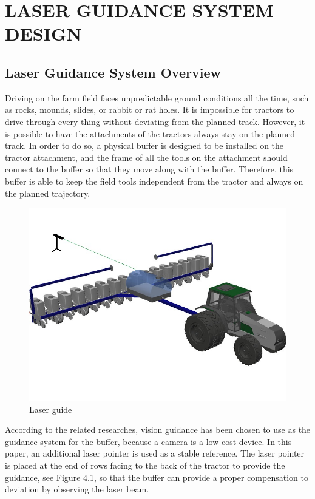 \chapter{LASER GUIDANCE SYSTEM DESIGN}

\section{Laser Guidance System Overview}
Driving on the farm field faces unpredictable ground conditions all the time, such as rocks, mounds, slides, or rabbit or rat holes. It is impossible for tractors to drive through every thing without deviating from the planned track. However, it is possible to have the attachments of the tractors always stay on the planned track. In order to do so, a physical buffer is designed to be installed on the tractor attachment, and the frame of all the tools on the attachment should connect to the buffer so that they move along with the buffer. Therefore, this buffer is able to keep the field tools independent from the tractor and always on the planned trajectory.
\begin{figure}[ht!]
\begin{center}
\includegraphics[scale = 0.6]{pics/tractor.jpg}
\caption{Laser guide}
\end{center}
\end{figure}

According to the related researches, vision guidance has been chosen to use as the guidance system for the buffer, because a camera is a low-cost device. In this paper, an additional laser pointer is used as a stable reference. The laser pointer is placed at the end of rows facing to the back of the tractor to provide the guidance, see Figure 4.1, so that the buffer can provide a proper compensation to deviation by observing the laser beam. 

